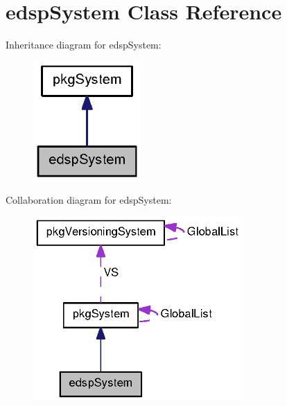 \section{edsp\-System \-Class \-Reference}
\label{classedspSystem}


\-Inheritance diagram for edsp\-System\-:
\nopagebreak
\begin{figure}[H]
\begin{center}
\leavevmode
\includegraphics[width=116pt]{classedspSystem__inherit__graph}
\end{center}
\end{figure}


\-Collaboration diagram for edsp\-System\-:
\nopagebreak
\begin{figure}[H]
\begin{center}
\leavevmode
\includegraphics[width=225pt]{classedspSystem__coll__graph}
\end{center}
\end{figure}
